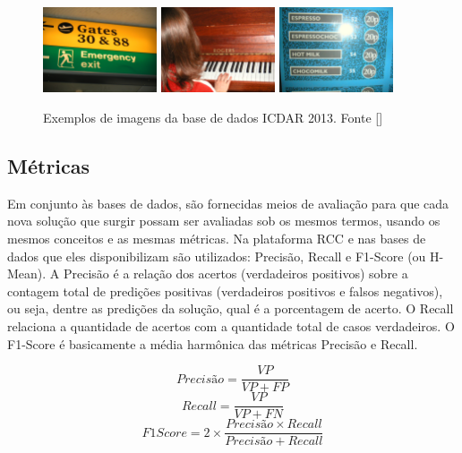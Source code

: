 \begin{figure}
    \centering
    \includegraphics[width=0.3\textwidth]{figs/img_20.jpg}
    \includegraphics[width=0.3\textwidth]{figs/img_85.jpg}
    \includegraphics[width=0.3\textwidth]{figs/img_225.jpg}
    \caption{Exemplos de imagens da base de dados ICDAR 2013. Fonte []}
    \label{fig:icdar2013_examples}
\end{figure}

\subsection{Métricas}\label{sec:methodology_metrics}
Em conjunto às bases de dados, são fornecidas meios de avaliação para que cada nova solução que surgir possam ser avaliadas sob os mesmos termos, usando os mesmos conceitos e as mesmas métricas. Na plataforma RCC e nas bases de dados que eles disponibilizam são utilizados: Precisão, Recall e F1-Score (ou H-Mean). A Precisão é a relação dos acertos (verdadeiros positivos) sobre a contagem total de predições positivas (verdadeiros positivos e falsos negativos), ou seja, dentre as predições da solução, qual é a porcentagem de acerto. O Recall relaciona a quantidade de acertos com a quantidade total de casos verdadeiros. O F1-Score é basicamente a média harmônica das métricas Precisão e Recall.

\begin{equation}
    Precisão = \frac{VP}{VP + FP}
\end{equation}
\begin{equation}
    Recall = \frac{VP}{VP + FN}
\end{equation}
\begin{equation}
    F1Score = 2 \times \frac{Precisão \times Recall}{Precisão + Recall}
\end{equation}

